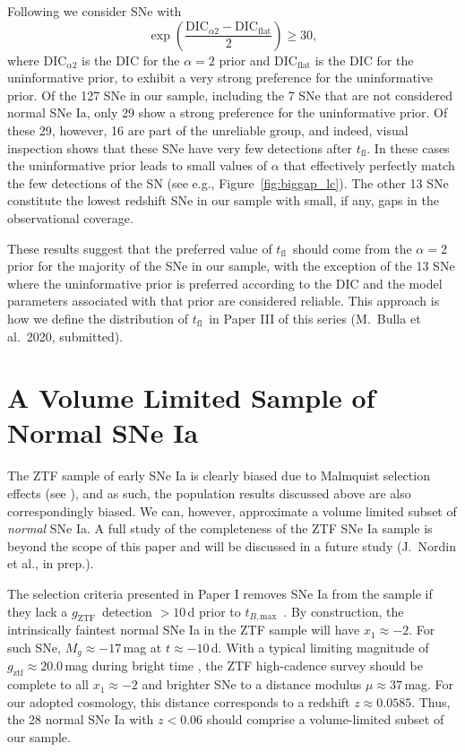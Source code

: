 \documentclass[twocolumn]{./aastex63}
\newcommand{\gztf}{$g_\mathrm{ZTF}$}
\newcommand{\tfl}{$t_\mathrm{fl}$}
\newcommand{\tbmax}{$t_{B,\mathrm{max}}$}
\begin{document}
Following \citet{Jeffreys61} we consider SNe with
%
$$\exp\left(\frac{\mathrm{DIC}_{\alpha2} - \mathrm{DIC}_\mathrm{flat}}{2}\right) \ge 30,$$
%
where $\mathrm{DIC}_{\alpha2}$ is the DIC for the $\alpha = 2$ prior and
$\mathrm{DIC}_\mathrm{flat}$ is the DIC for the uninformative prior, to
exhibit a very strong preference for the uninformative prior. Of the 127 SNe in
our sample, including the 7 SNe that are not considered normal SNe Ia, only 29
show a strong preference for the uninformative prior. Of these 29, however, 16
are part of the unreliable group, and indeed, visual inspection shows that
these SNe have very few detections after \tfl. In these cases the uninformative
prior leads to small values of $\alpha$ that effectively perfectly match the
few detections of the SN (see e.g., Figure~\ref{fig:biggap_lc}). The other 13
SNe constitute the lowest redshift SNe in our sample with small, if any, gaps
in the observational coverage.

These results suggest that the preferred value of \tfl\ should come from the
$\alpha = 2$ prior for the majority of the SNe in our sample, with the
exception of the 13 SNe where the uninformative prior is preferred according to
the DIC and the model parameters associated with that prior are considered
reliable. This approach is how we define the distribution of \tfl\ in Paper
III of this series (M.~Bulla et al.~2020, submitted).

\section{A Volume Limited Sample of Normal SNe Ia}\label{sec:volume_limited}

The ZTF sample of early SNe Ia is clearly biased due to Malmquist selection
effects (see \citealt{Yao19}), and as such, the population results discussed
above are also correspondingly biased. We can, however, approximate a volume
limited subset of \textit{normal} SNe Ia. A full study of the completeness of
the ZTF SNe Ia sample is beyond the scope of this paper and will be discussed in
a future study (J.~Nordin et al., in prep.).

The selection criteria presented in Paper I removes SNe Ia from the sample if
they lack a \gztf\ detection $> 10$\,d prior to \tbmax\ \citep{Yao19}. By
construction, the intrinsically faintest normal SNe Ia in the ZTF sample will
have $x_1 \approx -2$. For such SNe, $M_g \approx -17$\,mag at $t \approx
-10$\,d. With a typical limiting magnitude of $g_\mathrm{ztf} \approx 20.0$\,mag
during bright time \citep{Bellm19}, the ZTF high-cadence survey should be
complete to all $x_1 \approx -2$ and brighter SNe to a distance modulus $\mu
\approx 37$\,mag. For our adopted cosmology, this distance corresponds to a
redshift $z \approx 0.0585$. Thus, the 28 normal SNe Ia with $z < 0.06$ should
comprise a volume-limited subset of our sample.
\end{document}
